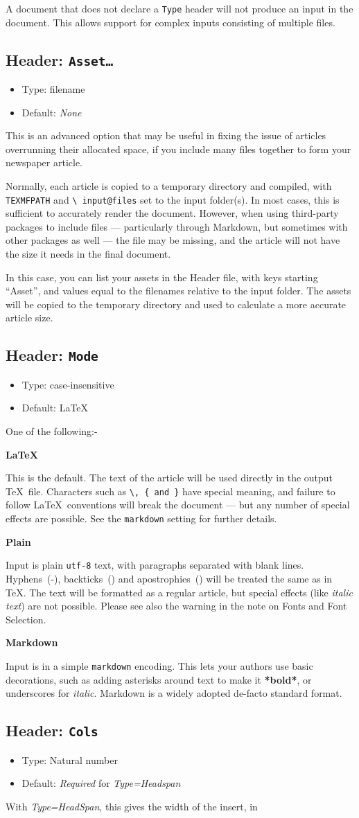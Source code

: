 \documentclass[a4paper,DIV=11]{scrartcl}
\newcommand{\deft}[2]{\nopagebreak\noindent\hspace{0.5in}\textbf{#1}\par\noindent{}#2\pagebreak[1]\par}
\newcommand{\property}[5]{
  \subsection{#1: \texttt{#2}}
  \begin{itemize}
  \item Type: #3
  \item Default: #4
  \end{itemize}
  #5
}
\newcommand{\header}{\property{Header}}
\begin{document}
\begin{multicols}{2}
{  A document that does not declare a \texttt{Type} header will not
  produce an input in the document. This allows support for
  complex inputs consisting of multiple files.
}
\header{Asset\dots}{filename}{\textit{None}}{
  This is an advanced option that may be useful in fixing the issue of
  articles overrunning their allocated space, if you include many
  files together to form your newspaper article.\par
  Normally, each article is copied to a temporary directory and
  compiled, with \texttt{TEXMFPATH} and \texttt{\textbackslash
    input@files} set to the input folder(s). In most cases, this is
  sufficient to accurately render the document. However, when using
  third-party packages to include files --- particularly through
  Markdown, but sometimes with other packages as well --- the file may
  be missing, and the article will not have the size it needs in the
  final document.\par
  In this case, you can list your assets in the Header file, with
  keys starting ``Asset'', and values equal to the filenames relative
  to the input folder. The assets will be copied to the temporary
  directory and used to calculate a more accurate article size.
}
\header{Mode}{case-insensitive}{LaTeX}{
  One of the following:-\par
  \deft{LaTeX}{This is the default. The text of the article will be used
    directly in the output \TeX\ file. Characters such as
    \texttt{\textbackslash, \{ and \}} have special meaning, and failure to
    follow \LaTeX\ conventions will break the document --- but any number
    of special effects are possible. See the \texttt{markdown} setting
    for further details.}
  \deft{Plain}{Input is plain \texttt{utf-8} text, with paragraphs separated
    with blank lines. Hyphens~(-), backticks~(\textasciigrave) and apostrophies~(\textasciiacute) will be
    treated the same as in \TeX. The text will be formatted as a regular article, but
    special effects (like \textit{italic text}) are not
    possible. Please see also the warning in the note on Fonts and
    Font Selection.}
  \deft{Markdown}{Input is in a simple \texttt{markdown} encoding.
    This lets your authors use basic decorations, such as adding
    asterisks around text to make it \textbf{*bold*}, or underscores
    for \textit{\textunderscore italic\textunderscore}. Markdown is a
    widely adopted de-facto standard format.}
}
\header{Cols}{Natural number}{\textit{Required} for \textit{Type=Headspan}}{
  With \textit{Type=HeadSpan}, this gives the width of the insert, in
}
\end{multicols}
\end{document}
